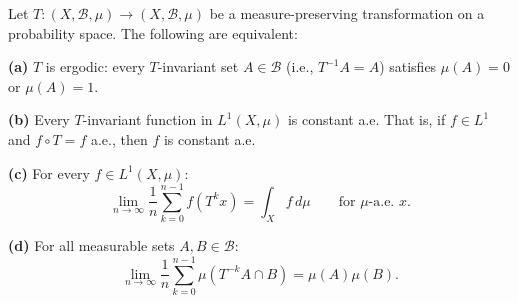 \begin{theorem}\label{thm:9.12}
Let $T: (X, \mathcal{B}, \mu) \to (X, \mathcal{B}, \mu)$ be a measure-preserving transformation on a probability space. The following are equivalent:

\textbf{(a)} $T$ is ergodic: every $T$-invariant set $A \in \mathcal{B}$ (i.e., $T^{-1}A = A$) satisfies $\mu(A) = 0$ or $\mu(A) = 1$.

\textbf{(b)} Every $T$-invariant function in $L^1(X, \mu)$ is constant a.e. That is, if $f \in L^1$ and $f \circ T = f$ a.e., then $f$ is constant a.e.

\textbf{(c)} For every $f \in L^1(X, \mu)$:
\[
\lim_{n \to \infty} \frac{1}{n} \sum_{k=0}^{n-1} f(T^k x) = \int_X f \, d\mu \qquad \text{for } \mu\text{-a.e. } x.
\]

\textbf{(d)} For all measurable sets $A, B \in \mathcal{B}$:
\[
\lim_{n \to \infty} \frac{1}{n} \sum_{k=0}^{n-1} \mu(T^{-k}A \cap B) = \mu(A)\mu(B).
\]
\end{theorem}


